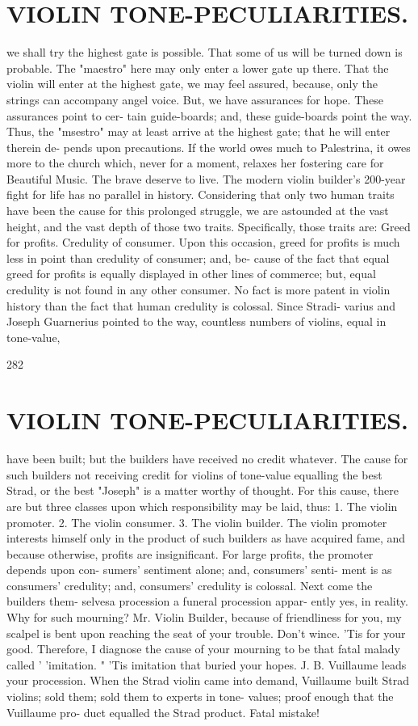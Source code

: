 \documentclass{article}
\begin{document}
\section*{VIOLIN TONE-PECULIARITIES.}
we shall try the highest gate is possible. That some of us will be turned down is probable. The "maestro" here may only enter a lower gate up there. That the violin will enter at the highest gate, we may feel assured, because, only the strings can accompany angel voice. But, we have assurances for hope. These assurances point to cer- tain guide-boards; and, these guide-boards point the way. Thus, the "msestro" may at least arrive at the highest gate; that he will enter therein de- pends upon precautions. If the world owes much to Palestrina, it owes more to the church which, never for a moment, relaxes her fostering care for Beautiful Music. The brave deserve to live. The modern violin builder's 200-year fight for life has no parallel in history. Considering that only two human traits have been the cause for this prolonged struggle, we are astounded at the vast height, and the vast depth of those two traits. Specifically, those traits are: Greed for profits. Credulity of consumer. Upon this occasion, greed for profits is much less in point than credulity of consumer; and, be- cause of the fact that equal greed for profits is equally displayed in other lines of commerce; but, equal credulity is not found in any other consumer. No fact is more patent in violin history than the fact that human credulity is colossal. Since Stradi- varius and Joseph Guarnerius pointed to the way, countless numbers of violins, equal in tone-value,

282

\section*{VIOLIN TONE-PECULIARITIES.}
have been built; but the builders have received no credit whatever. The cause for such builders not receiving credit for violins of tone-value equalling the best Strad, or the best "Joseph" is a matter worthy of thought. For this cause, there are but three classes upon which responsibility may be laid, thus: 1. The violin promoter. 2. The violin consumer. 3. The violin builder. The violin promoter interests himself only in the product of such builders as have acquired fame, and because otherwise, profits are insignificant. For large profits, the promoter depends upon con- sumers' sentiment alone; and, consumers' senti- ment is as consumers' credulity; and, consumers' credulity is colossal. Next come the builders them- selvesa procession a funeral procession appar- ently yes, in reality. Why for such mourning? Mr. Violin Builder, because of friendliness for you, my scalpel is bent upon reaching the seat of your trouble. Don't wince. 'Tis for your good. Therefore, I diagnose the cause of your mourning to be that fatal malady called ' 'imitation. " 'Tis imitation that buried your hopes. J. B. Vuillaume leads your procession. When the Strad violin came into demand, Vuillaume built Strad violins; sold them; sold them to experts in tone- values; proof enough that the Vuillaume pro- duct equalled the Strad product. Fatal mistake!
\end{document}
